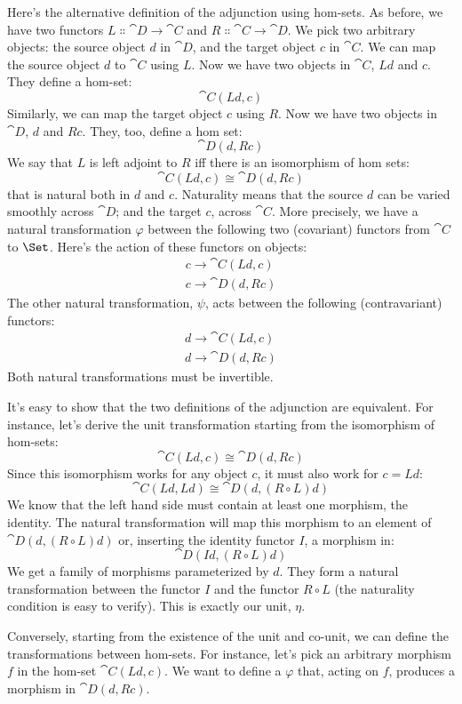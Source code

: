 \noindent
Here's the alternative definition of the adjunction using hom-sets. As
before, we have two functors $L \Colon \cat{D} \to \cat{C}$ and
$R \Colon \cat{C} \to \cat{D}$. We pick two arbitrary objects: the
source object $d$ in $\cat{D}$, and the target object $c$
in $\cat{C}$. We can map the source object $d$ to $\cat{C}$ using
$L$. Now we have two objects in $\cat{C}$, $L d$ and
$c$. They define a hom-set:
\[\cat{C}(L d, c)\]
Similarly, we can map the target object $c$ using $R$. Now
we have two objects in $\cat{D}$, $d$ and $R c$. They,
too, define a hom set:
\[\cat{D}(d, R c)\]
We say that $L$ is left adjoint to $R$ iff there is an
isomorphism of hom sets:
\[\cat{C}(L d, c) \cong \cat{D}(d, R c)\]
that is natural both in $d$ and $c$.
Naturality means that the source $d$ can be varied smoothly
across $\cat{D}$; and the target $c$, across $\cat{C}$. More
precisely, we have a natural transformation $\varphi$ between the
following two (covariant) functors from $\cat{C}$ to $\Set$. Here's
the action of these functors on objects:
\begin{gather*}
c \to \cat{C}(L d, c) \\
c \to \cat{D}(d, R c)
\end{gather*}
The other natural transformation, $\psi$, acts between the following
(contravariant) functors:
\begin{gather*}
d \to \cat{C}(L d, c) \\
d \to \cat{D}(d, R c)
\end{gather*}
Both natural transformations must be invertible.

It's easy to show that the two definitions of the adjunction are
equivalent. For instance, let's derive the unit transformation starting
from the isomorphism of hom-sets:
\[\cat{C}(L d, c) \cong \cat{D}(d, R c)\]
Since this isomorphism works for any object $c$, it must also
work for $c = L d$:
\[\cat{C}(L d, L d) \cong \cat{D}(d, (R \circ L) d)\]
We know that the left hand side must contain at least one morphism, the
identity. The natural transformation will map this morphism to an
element of $\cat{D}(d, (R \circ L) d)$ or, inserting the identity
functor $I$, a morphism in:
\[\cat{D}(I d, (R \circ L) d)\]
We get a family of morphisms parameterized by $d$. They form a
natural transformation between the functor $I$ and the functor
$R \circ L$ (the naturality condition is easy to verify). This is
exactly our unit, $\eta$.

Conversely, starting from the existence of the unit and co-unit, we can
define the transformations between hom-sets. For instance, let's pick an
arbitrary morphism $f$ in the hom-set $\cat{C}(L d, c)$. We
want to define a $\varphi$ that, acting on $f$, produces a
morphism in $\cat{D}(d, R c)$.

